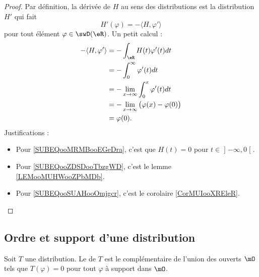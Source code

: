 \begin{proof}
	Par définition, la dérivée de \( H\) au sens des distributions est la distribution \( H'\) qui fait
	\begin{equation}
		H'(\varphi)=-\langle H, \varphi'\rangle
	\end{equation}
	pour tout élément \( \varphi\in\swD(\eR)\). Un petit calcul :
	\begin{subequations}
		\begin{align}
			-\langle H, \varphi'\rangle & =-\int_{\eR}H(t)\varphi'(t)dt                                                          \\
			                            & =-\int_{0}^{\infty}\varphi'(t)dt       \label{SUBEQooMRMBooEGeDra}                     \\
			                            & =-\lim_{x\to \infty} \int_0^x\varphi'(t)dt     \label{SUBEQooZDSDooTbzgWD}             \\
			                            & =-\lim_{x\to \infty} \big( \varphi(x)-\varphi(0) \big)     \label{SUBEQooSUAHooOmjgcr} \\
			                            & =\varphi(0).
		\end{align}
	\end{subequations}
	Justifications :
	\begin{itemize}
		\item Pour \eqref{SUBEQooMRMBooEGeDra}, c'est que \( H(t)=0\) pour \( t\in \mathopen] -\infty , 0 \mathclose[\).
		\item Pour \eqref{SUBEQooZDSDooTbzgWD}, c'est le lemme \ref{LEMooMUHWooZPbMDb}.
		\item Pour \eqref{SUBEQooSUAHooOmjgcr}, c'est le corolaire \ref{CorMUIooXREleR}.
	\end{itemize}
\end{proof}

\subsection{Ordre et support d'une distribution}

\begin{definition}        \label{DefVILMooBIYerO}
	Soit \( T\) une distribution. Le  de \( T\) est le complémentaire de l'union des ouverts \( \mO\) tels que \( T(\varphi)=0\) pour tout \( \varphi\) à support dans \( \mO\).
\end{definition}

